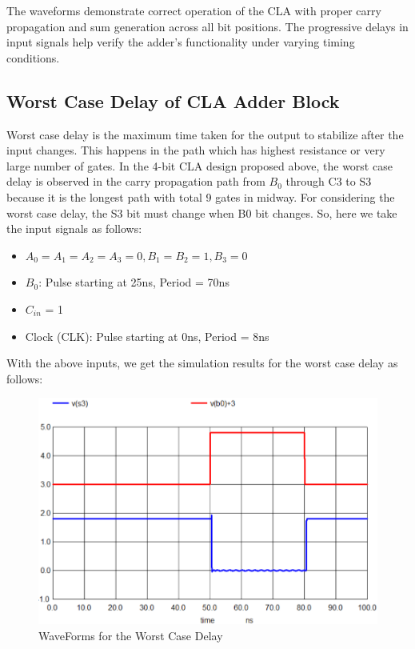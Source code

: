 \documentclass[conference]{IEEEtran}
\begin{document}
The waveforms demonstrate correct operation of the CLA with proper carry propagation and sum generation across all bit positions. The progressive delays in input signals help verify the adder's functionality under varying timing conditions.

\subsection{Worst Case Delay of CLA Adder Block}
Worst case delay is the maximum time taken for the output to stabilize after the input changes. This happens in the path which has highest resistance or very large number of gates. In the 4-bit CLA design proposed above, the worst case delay is observed in the carry propagation path from  $B_0$ through C3 to S3 because it is the longest path with total 9 gates in midway. 
For considering the worst case delay, the S3 bit must change when B0 bit changes. So, here we take the input signals as follows:
\begin{itemize}
    \item $A_0 = A_1 = A_2 = A_3 = 0, B_1 = B_2 = 1, B_3 = 0$
    \item $B_0$: Pulse starting at 25ns, Period = 70ns
    \item $C_{in}$ = 1
    \item Clock (CLK): Pulse starting at 0ns, Period = 8ns
\end{itemize}

With the above inputs, we get the simulation results for the worst case delay as follows:
\begin{figure}[H]
    \centering
    \includegraphics[width=1\linewidth]{clapreworst.png}
    \caption{WaveForms for the Worst Case Delay}
    \label{fig:worst_case_delay}
\end{figure}
\end{document}
